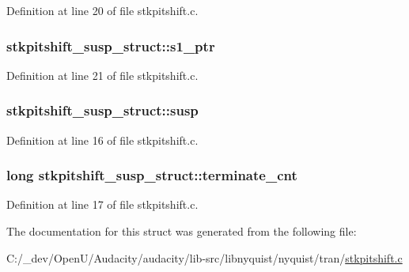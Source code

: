 Definition at line 20 of file stkpitshift.\+c.

\subsubsection[{\texorpdfstring{s1\+\_\+ptr}{s1_ptr}}]{ stkpitshift\+\_\+susp\+\_\+struct\+::s1\+\_\+ptr}\hypertarget{structstkpitshift__susp__struct_a1e4ba71d9a5b4b3ed224f9efaf5aec81}{}\label{structstkpitshift__susp__struct_a1e4ba71d9a5b4b3ed224f9efaf5aec81}


Definition at line 21 of file stkpitshift.\+c.

\subsubsection[{\texorpdfstring{susp}{susp}}]{ stkpitshift\+\_\+susp\+\_\+struct\+::susp}\hypertarget{structstkpitshift__susp__struct_a424f756baf5b70f076b03d8559186e5a}{}\label{structstkpitshift__susp__struct_a424f756baf5b70f076b03d8559186e5a}


Definition at line 16 of file stkpitshift.\+c.

\subsubsection[{\texorpdfstring{terminate\+\_\+cnt}{terminate_cnt}}]{\setlength{\rightskip}{0pt plus 5cm}long stkpitshift\+\_\+susp\+\_\+struct\+::terminate\+\_\+cnt}\hypertarget{structstkpitshift__susp__struct_af2b98ec96caae83112e63dcab4cfd389}{}\label{structstkpitshift__susp__struct_af2b98ec96caae83112e63dcab4cfd389}


Definition at line 17 of file stkpitshift.\+c.



The documentation for this struct was generated from the following file\+:\begin{DoxyCompactItemize}
\item 
C\+:/\+\_\+dev/\+Open\+U/\+Audacity/audacity/lib-\/src/libnyquist/nyquist/tran/\hyperlink{stkpitshift_8c}{stkpitshift.\+c}\end{DoxyCompactItemize}
